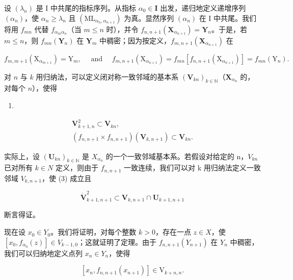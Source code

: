 设 \((\lambda_{n})\) 是 I 中共尾的指标序列。从指标 \(\alpha_0 \in \mathbf{I}\) 出发，递归地定义递增序列 \((\alpha_{n})\)，使 \(\alpha_{n} \geqslant \lambda_{n}\) 且 \((\mathrm{ML}_{\alpha_{n}, \alpha_{n+1}})\) 为真。显然序列 \((\alpha_{n})\) 在 I 中共尾。我们将用 \(f_{mn}\) 代替 \(f_{\alpha_m\alpha_n}\)（当 \(m \leqslant n\) 时），并令 \(f_{n,n+1}(\mathbf{X}_{\alpha_{n+1}}) = \mathbf{Y}_n\)。于是，若 \(m \leqslant n\)，则 \(f_{mn}(\mathbf{Y}_n)\) 在 \(\mathbf{Y}_m\) 中稠密；因为按定义，\(f_{m,n+1}(\mathbf{X}_{\alpha_{n+1}})\) 在

\[
f _ {m, m + 1} \left(\mathrm{X} _ {\alpha_ {m + 1}}\right) = \mathrm{Y} _ {m}, \quad \text { and } \quad f _ {m, n + 1} \left(\mathrm{X} _ {\alpha_ {n + 1}}\right) = f _ {m n} \left[ f _ {n, n + 1} \left(\mathrm{X} _ {\alpha_ {n + 1}}\right) \right] = f _ {m n} \left(\mathrm{Y} _ {n}\right).
\]

对 \(n\) 与 \(k\) 用归纳法，可以定义闭对称一致邻域的基本系 \((\mathbf{V}_{kn})_{k\in \mathbb{N}}\)（\(\mathbf{X}_{\alpha_n}\) 的，对每个 \(n\)），使得

\begin{enumerate}
\def\labelenumi{(\arabic{enumi})}
\setcounter{enumi}{1}
\tightlist
\item
\end{enumerate}

\[
\begin{array}{c} \mathbf {V} _ {k + 1, n} ^ {2} \subset \mathbf {V} _ {k n}, \\ (f _ {n, n + 1} \times f _ {n, n + 1}) (\mathbf {V} _ {k, n + 1}) \subset \mathbf {V} _ {k n}. \end{array}\tag{3}
\]

实际上，设 \((\mathbf{U}_{kn})_{k\in\mathbb{N}}\) 是 \(X_{\alpha_{n}}\) 的一个一致邻域基本系。若假设对给定的 n，\(V_{kn}\) 已对所有 \(k\in N\) 定义，则由于 \(f_{n,n+1}\) 一致连续，我们可以对 k 用归纳法定义一致邻域 \(V_{k,n+1}\)，使 (3) 成立且

\[
\mathbf {\dot {V}} _ {k + 1, n + 1} ^ {2} \subset \mathbf {V} _ {k, n + 1} \cap \mathbf {U} _ {k + 1, n + 1}
\]

断言得证。

现在设 \(x_0 \in Y_0\)。我们将证明，对每个整数 \(k > 0\)，存在一点 \(z \in X\)，使 \([x_0, f_{\alpha_0}(z)] \in V_{k-1,0}\)；这就证明了定理。由于 \(f_{n,n+1}(Y_{n+1})\) 在 \(Y_n\) 中稠密，我们可以归纳地定义点列 \(x_n \in Y_n\)，使得

\[
\left[ x _ {n}, f _ {n, n + 1} \left(x _ {n + 1}\right) \right] \in \mathrm{V} _ {k + n, n}.\tag{4}
\]

